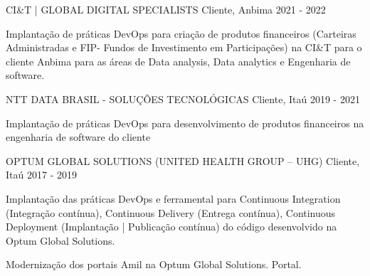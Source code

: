 

\begin{cventries}

  \cventry
    {CI\&T | GLOBAL DIGITAL SPECIALISTS} %
    {Cliente, Anbima } %
    {2021 - 2022} %
    {
      \begin{cvitems} %
        \item {Implantação de práticas DevOps para criação de produtos financeiros (Carteiras Administradas e FIP- Fundos de Investimento em Participações) na CI&T para o cliente Anbima para as áreas de Data analysis, Data analytics e Engenharia de software.}
      \end{cvitems}
    }

  \cventry
    {NTT DATA BRASIL - SOLUÇÕES TECNOLÓGICAS} %
    {Cliente, Itaú} %
    {2019 - 2021} %
    {
      \begin{cvitems} %
        \item {Implantação de práticas DevOps para desenvolvimento de produtos financeiros na engenharia de software do cliente}
      \end{cvitems}
    }

  \cventry
    {OPTUM GLOBAL SOLUTIONS (UNITED HEALTH GROUP – UHG)} %
    {Cliente, Itaú} %
    {2017 - 2019} %
    {
      \begin{cvitems} %
        \item {Implantação das práticas DevOps e ferramental para Continuous Integration (Integração contínua), Continuous Delivery (Entrega contínua), Continuous Deployment (Implantação | Publicação contínua) do código desenvolvido na Optum Global Solutions.}
        \item {Modernização dos portais Amil na Optum Global Solutions. Portal.}
      \end{cvitems}
    }

\end{cventries}
